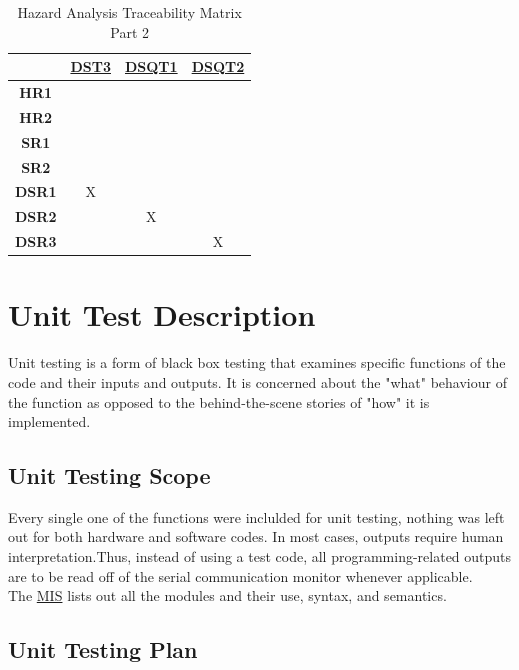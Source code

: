 \documentclass[12pt, titlepage]{article}
\begin{document}
\begin{table}[H]
	\centering
	\begin{tabular}{|c|c|c|c|}
	\hline
	&\hyperref[DST3]{DST3}&\hyperref[DSQT1]{DSQT1}&\hyperref[DSQT2]{DSQT2} \\
	\hline       
	\textbf{HR1}         &&& \\ \hline
	\textbf{HR2}         &&& \\ \hline
	\textbf{SR1}         &&& \\ \hline
	\textbf{SR2}         &&& \\ \hline
	\textbf{DSR1}       &X&& \\ \hline
	\textbf{DSR2}       &&X& \\ \hline
	\textbf{DSR3}       &&&X \\ \hline
	\hline
	\end{tabular}
	\caption{Hazard Analysis Traceability Matrix Part 2}
	\label{Table:C_trace}
\end{table}

\newpage
\section{Unit Test Description}
Unit testing is a form of black box testing that examines specific functions of the code and their inputs and outputs. It is concerned about the "what" behaviour of the function as opposed to the behind-the-scene stories of "how" it is implemented.
\subsection{Unit Testing Scope}
Every single one of the functions were inclulded for unit testing, nothing was left out for both hardware and software codes. In most cases, outputs require human interpretation.Thus, instead of using a test code, all programming-related outputs are to be read off of the serial communication monitor whenever applicable. \\

The \href{https://github.com/zakerl/Capstone_Project/blob/main/docs/Design/SoftDetailedDes/MIS.pdf}{MIS} lists out all the modules and their use, syntax, and semantics.

\subsection{Unit Testing Plan}\label{6.2}
\end{document}
